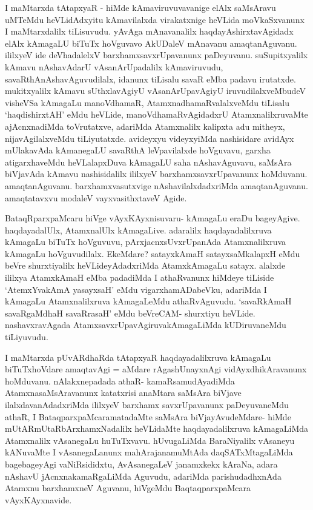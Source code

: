 \begin{artha}
I maMtarxda tAtapxyaR - hiMde kAmaviruvuvavanige elAlx saMsAravu uMTeMdu heVLidAdxyitu kAmavilalxda virakatxnige heVLida moVkaSxvanunx I maMtarxdalilx tiLisuvudu. yAvAga mAnavanalilx haqdayAshirxtavAgidadx elAlx kAmagaLU biTuTx hoVguvavo AkUDaleV mAnavanu amaqtanAguvanu. ililxyeV ide deVhadalelxV barxhamxsavxrUpavanunx paDeyuvanu. suSupitxyalilx kAmavu nAshavAdarU vAsanArUpadalilx kAmaviruvudu, savaRthAnAshavAguvudilalx, idanunx tiLisalu savaR eMba padavu irutatxde. mukitxyalilx kAmavu sUthxlavAgiyU vAsanArUpavAgiyU iruvudilalxveMbudeV visheVSa kAmagaLu manoVdhamaR, AtamxnadhamaRvalalxveMdu tiLisalu `haqdishirxtAH' eMdu heVLide, manoVdhamaRvAgidadxrU AtamxnalilxruvaMte ajAcnxnadiMda toVrutatxve, adariMda Atamxnalilx kalipxta adu mitheyx, nijavAgilalxveMdu tiLiyutatxde. avideyxyu videyxyiMda nashisidare avidAyx mUlakavAda kAmanegaLU savaRthA leVpavilalxde hoVguvavu, garxha atigarxhaveMdu heVLalapxDuva kAmagaLU saha nAshavAguvavu, saMsAra biVjavAda kAmavu nashisidalilx ililxyeV barxhamxsavxrUpavanunx hoMduvanu. amaqtanAguvanu. barxhamxvasutxvige nAshavilalxdadxriMda amaqtanAguvanu. amaqtatavxvu modaleV vayxvasithxtaveV Agide.
\end{artha}


\begin{artha}
BataqRparxpaMcaru hiVge vAyxKAyxnisuvaru- kAmagaLu eraDu bageyAgive. haqdayadalUlx, AtamxnalUlx kAmagaLive. adaralilx haqdayadalilxruva kAmagaLu biTuTx hoVguvuvu, pArxjacnxsUvxrUpanAda Atamxnalilxruva kAmagaLu hoVguvudilalx. EkeMdare? satayxkAmaH satayxsaMkalapxH eMdu beVre shurxtiyalilx heVLideyAdadxriMda AtamxkAmagaLu satayx. alalxde ililxya AtamxkAmaH eMba padadiMda I athaRvanunx hiMdeye tiLiside `AtemxYvakAmA yasayxsaH' eMdu vigarxhamADabeVku, adariMda I kAmagaLu Atamxnalilxruva kAmagaLeMdu athaRvAguvudu. `savaRkAmaH savaRgaMdhaH savaRrasaH' eMdu beVreCAM- shurxtiyu heVLide. nashavxravAgada AtamxsavxrUpavAgiruvakAmagaLiMda kUDiruvaneMdu tiLiyuvudu.

I maMtarxda pUvARdhaRda tAtapxyaR haqdayadalilxruva kAmagaLu biTuTxhoVdare amaqtavAgi = aMdare rAgashUnayxnAgi vidAyxdhikAravanunx hoMduvanu. nAlakxnepadada athaR- kamaRsamudAyadiMda AtamxnasaMsAravanunx katatxrisi anaMtara saMsAra biVjave ilalxdavanAdadxriMda ililxyeV barxhamx savxrUpavanunx paDeyuvaneMdu athaR, I BataqparxpaMcaramatadaMte saMsAra biVjayAvudeMdare- hiMde mUtARmUtaRbArxhamxNadalilx heVLidaMte haqdayadalilxruva kAmagaLiMda Atamxnalilx vAsanegaLu huTuTxvavu. hUvugaLiMda BaraNiyalilx vAsaneyu kANuvaMte I vAsanegaLanunx mahArajanamuMtAda daqSATxMtagaLiMda bagebageyAgi vaNiRsididxtu, AvAsanegaLeV janamxkekx kAraNa, adara nAshavU jAcnxnakamaRgaLiMda Aguvudu, adariMda parishudadhxnAda Atamxnu barxhamxneV Aguvanu, hiVgeMdu BaqtaqparxpaMcara vAyxKAyxnavide.
\end{artha}

